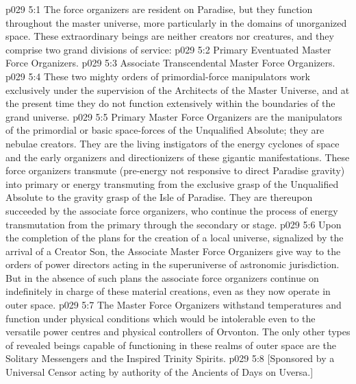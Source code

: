 \vs p029 5:1 The force organizers are resident on Paradise, but they function throughout the master universe, more particularly in the domains of unorganized space. These extraordinary beings are neither creators nor creatures, and they comprise two grand divisions of service:
\vs p029 5:2 \bibnobreakspace Primary Eventuated Master Force Organizers.
\vs p029 5:3 \bibnobreakspace Associate Transcendental Master Force Organizers.
\vs p029 5:4 \pc These two mighty orders of primordial\hyp{}force manipulators work exclusively under the supervision of the Architects of the Master Universe, and at the present time they do not function extensively within the boundaries of the grand universe.
\vs p029 5:5 \pc Primary Master Force Organizers are the manipulators of the primordial or basic space\hyp{}forces of the Unqualified Absolute; they are nebulae creators. They are the living instigators of the energy cyclones of space and the early organizers and directionizers of these gigantic manifestations. These force organizers transmute  (pre\hyp{}energy not responsive to direct Paradise gravity) into primary or  energy transmuting from the exclusive grasp of the Unqualified Absolute to the gravity grasp of the Isle of Paradise. They are thereupon succeeded by the associate force organizers, who continue the process of energy transmutation from the primary through the secondary or  stage.
\vs p029 5:6 Upon the completion of the plans for the creation of a local universe, signalized by the arrival of a Creator Son, the Associate Master Force Organizers give way to the orders of power directors acting in the superuniverse of astronomic jurisdiction. But in the absence of such plans the associate force organizers continue on indefinitely in charge of these material creations, even as they now operate in outer space.
\vs p029 5:7 The Master Force Organizers withstand temperatures and function under physical conditions which would be intolerable even to the versatile power centres and physical controllers of Orvonton. The only other types of revealed beings capable of functioning in these realms of outer space are the Solitary Messengers and the Inspired Trinity Spirits.
\vsetoff
\vs p029 5:8 [Sponsored by a Universal Censor acting by authority of the Ancients of Days on Uversa.]
